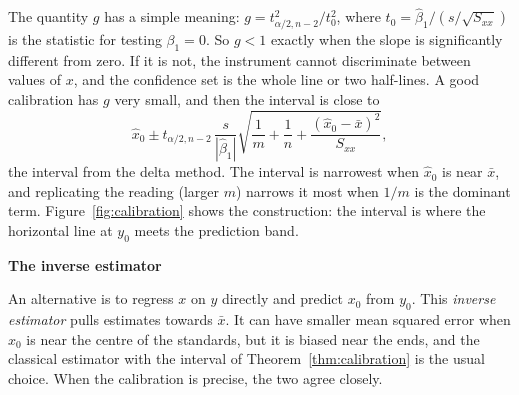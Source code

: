 \documentclass[11pt,a4paper]{article}
\numberwithin{equation}{section}
\theoremstyle{definition}
\newcommand{\subhead}[1]{%
  \par\medskip\noindent\textbf{#1}\par\nobreak\smallskip}
\begin{document}
The quantity $g$ has a simple meaning: $g = t_{\alpha/2,n-2}^2/t_0^2$, where $t_0 = \hat\beta_1/(s/\sqrt{S_{xx}})$ is the statistic for testing $\beta_1 = 0$. So
$g < 1$ exactly when the slope is significantly different from zero. If it is not, the instrument cannot
discriminate between values of $x$, and the confidence set is the whole line or two half-lines. A good
calibration has $g$ very small, and then the interval is close to
\[
\hat x_0 \pm t_{\alpha/2,n-2}\,\frac{s}{|\hat\beta_1|}\sqrt{\frac1m + \frac1n + \frac{(\hat x_0 - \bar x)^2}{S_{xx}}} ,
\]
the interval from the delta method. The interval is narrowest when $\hat x_0$ is near $\bar x$, and replicating the
reading (larger $m$) narrows it most when $1/m$ is the dominant term. Figure~\ref{fig:calibration} shows the
construction: the interval is where the horizontal line at $y_0$ meets the prediction band.

\subhead{The inverse estimator}
An alternative is to regress $x$ on $y$ directly and predict $x_0$ from $y_0$. This \emph{inverse estimator} pulls estimates
towards $\bar x$. It can have smaller mean squared error when $x_0$ is near the centre of the standards, but it is
biased near the ends, and the classical estimator with the interval of Theorem~\ref{thm:calibration} is the usual
choice. When the calibration is precise, the two agree closely.
\end{document}
